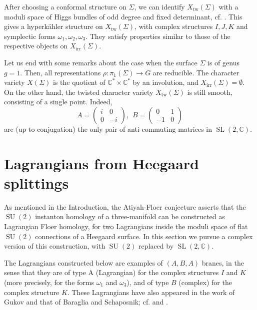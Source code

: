 \documentclass [11pt]{amsart}
\theoremstyle{remark}
\def\cc {{\mathbb{C}}}
\def\C{\cc}
\def\sl {{\operatorname{SL}(2, \cc)}}
\def\su {{\operatorname{SU}(2)}}
\def\Char {X}
\def\CharIrr {\Char_{\operatorname{irr}}}
\def\Xtw{\Char_{\operatorname{tw}}}
\begin{document}
After choosing a conformal structure on $\Sigma$, we can identify $\Xtw(\Sigma)$ with a moduli space of Higgs bundles of odd degree and fixed determinant, cf. \cite{Hitchin}. This gives a hyperk\"ahler structure on $\Xtw(\Sigma)$, with complex structures $I, J, K$ and symplectic forms $\omega_1, \omega_2, \omega_3$. They satisfy properties similar to those of the respective objects on $\CharIrr(\Sigma)$.


Let us end with some remarks about the case when the surface $\Sigma$ is of genus $g=1$. Then, all representations $\rho: \pi_1(\Sigma) \to G$ are reducible. The character variety $\Char(\Sigma)$ is the quotient of $\C^* \times \C^*$ by an involution, and $\CharIrr(\Sigma) = \emptyset.$ On the other hand, the twisted character variety $\Xtw(\Sigma)$ is still smooth, consisting of a single point. Indeed,
\begin{equation}
\label{eq:pair}
 A = 
\begin{pmatrix} 
i & 0 \\ 
0 & -i 
\end{pmatrix},  \ \
B = \begin{pmatrix} 
0 & 1 \\ 
-1 & 0 \end{pmatrix} 
\end{equation}
are (up to conjugation) the only pair of anti-commuting matrices in $\sl$.



\section{Lagrangians from Heegaard splittings}
\label{sec:Motivation}
As mentioned in the Introduction, the Atiyah-Floer conjecture \cite{AtiyahFloer} asserts that the  $\su$ instanton homology of a three-manifold can be constructed as Lagrangian Floer homology, for two Lagrangians inside the moduli space of flat $\su$ connections of a Heegaard surface. In this section we pursue a complex version of this construction, with $\su$ replaced by $\sl$.

The Lagrangians constructed below are examples of $(A,B,A)$ branes, in the sense that they are of type A (Lagrangian) for the complex structures $I$ and $K$ (more precisely, for the forms $\omega_1$ and $\omega_3$), and of type $B$ (complex) for the complex structure $K$. These Lagrangians have also appeared in the work of Gukov \cite{GukovSO} and that of Baraglia and Schaposnik; cf. \cite[Section 11]{BaragliaSchaposnikABA} and \cite{BaragliaSchaposnikReal}.
\end{document}
